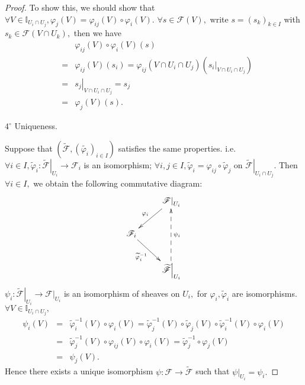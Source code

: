 \begin{proof}
To show this, we should show that $\forall V\in\mathds{I}_{U_i\cap
U_j}, \varphi_j(V)=\varphi_{ij}(V)\circ\varphi_i(V).$ $\forall
s\in\mathscr{F}(V),$ write $s=(s_k)_{k\in I}$ with
$s_k\in\mathscr{F}(V\cap U_k),$ then we have
\begin{eqnarray*}
& & \varphi_{ij}(V)\circ\varphi_i(V)(s)     \\
& = & \varphi_{ij}(V)(s_i) =
\varphi_{ij}(V\cap U_i\cap U_j)(\left.s_i\right|_{V\cap U_i\cap U_j})   \\
& = & \left.s_j\right|_{V\cap U_i\cap U_j} = s_j                        \\
& = & \varphi_j(V)(s).
\end{eqnarray*}

$\mathit{4^{\circ}}$ Uniqueness.

Suppose that $(\widetilde{\mathscr{F}},(\widetilde{\varphi_i})_{i\in
I})$ satisfies the same properties. i.e. $\forall i\in I,
\widetilde{\varphi}_i:
\left.\widetilde{\mathscr{F}}\right|_{U_i}\rightarrow \mathscr{F}_i$
is an isomorphism; $\forall i,j\in I,
\widetilde{\varphi}_i=\varphi_{ij}\circ\widetilde{\varphi}_j$ on
$\left.\widetilde{\mathscr{F}}\right|_{U_i\cap U_j}.$ Then $\forall
i\in I,$ we obtain the following commutative diagram:
\[ \xymatrix{
   & {\left.\mathscr{F}\right|_{U_i}} \ar[dl]_-{\varphi_i}                 \\
   {\mathscr{F}_i} \ar[dr]_-{\widetilde{\varphi}_i^{-1}}          \\
   & {\left.\widetilde{\mathscr{F}}\right|_{U_i}} \ar@{-->}[uu]_-{\psi_i} }
\]
$\psi_i: \left.\widetilde{\mathscr{F}}\right|_{U_i}\rightarrow
\left.\mathscr{F}\right|_{U_i}$ is an isomorphism of sheaves on
$U_i,$ for $\varphi_i,\widetilde{\varphi}_i$ are isomorphisms.
$\forall V\in\mathds{I}_{U_i\cap U_j},$
\begin{eqnarray*}
\psi_i(V) & = & \widetilde{\varphi}_i^{-1}(V)\circ\varphi_i(V) =
\widetilde{\varphi}_j^{-1}(V) \circ \widetilde{\varphi}_j(V) \circ
\widetilde{\varphi}_i^{-1}(V) \circ \varphi_i(V)                \\
& = & \widetilde{\varphi}_j^{-1}(V) \circ \varphi_{ij}(V) \circ
\varphi_i(V) = \widetilde{\varphi}_j^{-1} \circ \varphi_j(V)    \\
& = & \psi_j(V).
\end{eqnarray*}
Hence there exists a unique isomorphism $\psi:\mathscr{F}\rightarrow
\widetilde{\mathscr{F}}$ such that $\left.\psi\right|_{U_i}=\psi_i.$
\end{proof}
